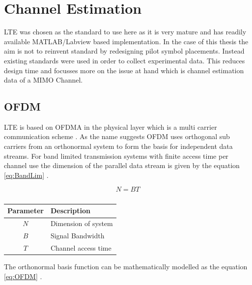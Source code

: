 \chapter{Channel Estimation}
\label{ch:ChEst}

LTE was chosen as the standard to use here as it is very mature and has readily available MATLAB/Labview based implementation. In the case of this thesis the aim is not to reinvent standard by redesigning pilot symbol placements. Instead existing standards were used in order to collect experimental data. This reduces design time and focusses more on the issue at hand which is channel estimation data of a MIMO Channel.

\section{OFDM}\label{sec:OFDM}
LTE is based on OFDMA in the physical layer which is a multi carrier communication scheme \cite{FazelKaiser}. As the name suggests OFDM uses orthogonal sub carriers from an orthonormal system to form the basis for independent data streams. For band limited transmission systems with finite access time per channel use the dimension of the parallel data stream is given by the equation \ref{eq:BandLim}  \cite{UtschickOFDM}.

        \begin{equation} \label{eq:BandLim}
            N = BT
        \end{equation}

        \begin{table}[H]
            \begin{center}
                \begin{tabular}{|c|l|}
                    \hline
                    Parameter& Description\\ \hline
                    $N$& Dimension of system \\ \hline
                    $B$& Signal Bandwidth \\ \hline
                    $T$& Channel access time \\
                    \hline
                \end{tabular}
                \caption{}
                \label{tab:BandLimTrans}
            \end{center}
        \end{table}

The orthonormal basis function can be mathematically modelled as the equation \ref{eq:OFDM} \cite{UtschickOFDM}.

